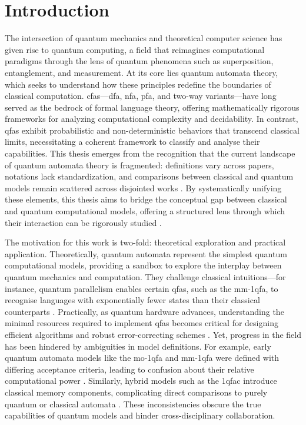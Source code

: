 \chapter{Introduction}  
\label{chap:introduction}

The intersection of quantum mechanics and theoretical computer science has given rise to quantum computing, a field that reimagines computational paradigms through the lens of quantum phenomena such as superposition, entanglement, and measurement. At its core lies quantum automata theory, which seeks to understand how these principles redefine the boundaries of classical computation. \glspl{cfa}—\gls{dfa}, \gls{nfa}, \gls{pfa}, and two-way variants—have long served as the bedrock of formal language theory, offering mathematically rigorous frameworks for analyzing computational complexity and decidability. In contrast, \glspl{qfa} exhibit probabilistic and non-deterministic behaviors that transcend classical limits, necessitating a coherent framework to classify and analyse their capabilities. This thesis emerges from the recognition that the current landscape of quantum automata theory is fragmented: definitions vary across papers, notations lack standardization, and comparisons between classical and quantum models remain scattered across disjointed works \cite{gruska2012quantum}. By systematically unifying these elements, this thesis aims to bridge the conceptual gap between classical and quantum computational models, offering a structured lens through which their interaction can be rigorously studied \cite{ambainis2009superiority}.  

The motivation for this work is two-fold: theoretical exploration and practical application. Theoretically, quantum automata represent the simplest quantum computational models, providing a sandbox to explore the interplay between quantum mechanics and computation. They challenge classical intuitions—for instance, quantum parallelism enables certain \glspl{qfa}, such as the \gls{mm-1qfa}, to recognise languages with exponentially fewer states than their classical counterparts \cite{ambainis1998one}. Practically, as quantum hardware advances, understanding the minimal resources required to implement \glspl{qfa} becomes critical for designing efficient algorithms and robust error-correcting schemes \cite{nielsen2010quantum}. Yet, progress in the field has been hindered by ambiguities in model definitions. For example, early quantum automata models like the \gls{mo-1qfa} and \gls{mm-1qfa} were defined with differing acceptance criteria, leading to confusion about their relative computational power \cite{kondacs1997power}. Similarly, hybrid models such as the \gls{1qfac} introduce classical memory components, complicating direct comparisons to purely quantum or classical automata \cite{li2012characterizations}. These inconsistencies obscure the true capabilities of quantum models and hinder cross-disciplinary collaboration.

